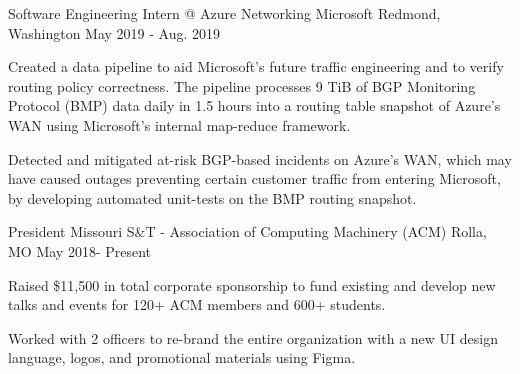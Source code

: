 

\begin{cventries}

\cventry
  {Software Engineering Intern @ Azure Networking} %
  {Microsoft} %
  {Redmond, Washington} %
  {May 2019 - Aug. 2019} %
  {
    \begin{cvitems} %
      \item {Created a data pipeline to aid Microsoft's future traffic
             engineering and to verify routing policy correctness. The pipeline
             processes 9 TiB of BGP Monitoring Protocol (BMP) data daily in 1.5 hours
             into a routing table snapshot of Azure's WAN using Microsoft's internal
             map-reduce framework.}
      \item{Detected and mitigated at-risk BGP-based incidents on Azure's WAN,
            which may have caused outages preventing certain customer traffic from
            entering Microsoft, by developing automated unit-tests on the BMP routing
            snapshot.}
    \end{cvitems}
  }


\cventry
  {President} %
  {Missouri S\&T - Association of Computing Machinery (ACM)} %
  {Rolla, MO} %
  {May 2018- Present} %
  {
    \begin{cvitems} %
      \item {Raised \$11,500 in total corporate sponsorship to fund existing and
             develop new talks and events for 120+ ACM members and 600+ students.}
      \item {Worked with 2 officers to re-brand the entire organization
             with a new UI design language, logos, and promotional materials
             using Figma.}
    \end{cvitems}
  }


\end{cventries}
